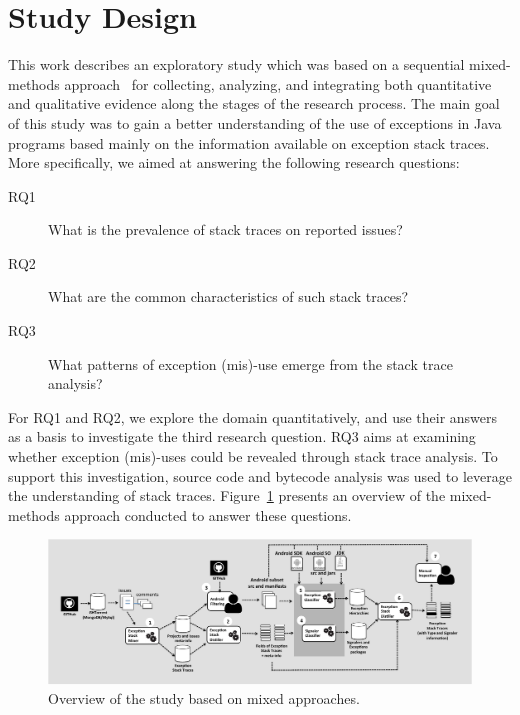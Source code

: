 \documentclass[conference]{IEEEtran}
\begin{document}
\section{Study Design}

This work describes an exploratory study which was based on a sequential
mixed-methods approach~\cite{ivankova2006using} for collecting, analyzing, and
integrating both quantitative and qualitative evidence along the stages of the
research process. The main goal of this study was to gain a better understanding
of the use of exceptions in Java programs based mainly on the information
available on exception stack traces. More specifically, we aimed at answering
the following research questions:

\begin{description}

  \item[RQ1] What is the prevalence of stack traces on  reported issues?

  \item[RQ2] What are the common characteristics of such stack traces?

  \item[RQ3] What patterns of exception (mis)-use emerge from the stack trace
    analysis?

\end{description}

For RQ1 and RQ2, we explore the domain quantitatively, and use their answers as
a basis to investigate the third research question. RQ3 aims at examining whether
exception (mis)-uses could be revealed through stack trace analysis. To
support this investigation, source code and bytecode analysis was used to
leverage the  understanding of stack traces. 
Figure~\ref{fig:overviewfig} presents an overview of the mixed-methods approach
conducted to answer these questions.

\begin{figure}
\centering
\includegraphics[width=\hsize]{overview.pdf}
\caption{Overview of the study based on mixed approaches.}
\label{fig:overviewfig}
\end{figure}
\end{document}
